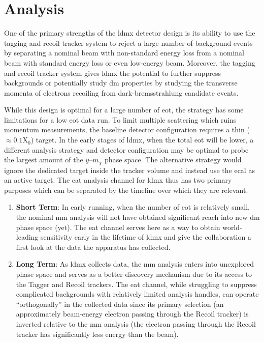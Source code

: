 \chapter{Analysis}
\label{chapter:ldmx:analysis}

One of the primary strengths of the \ac{ldmx} detector design is its ability to use the tagging
and recoil tracker system to reject a large number of background events by separating a nominal
beam with non-standard energy loss from a nominal beam with standard energy loss or even low-energy
beam. Moreover, the tagging and recoil tracker system gives \ac{ldmx} the potential to further suppress
backgrounds or potentially study \ac{dm} properties by studying the transverse momenta of electrons
recoiling from dark-bremsstrahlung candidate events.

While this design is optimal for a large number of \ac{eot}, the strategy has some limitations for a low
\ac{eot} data run. To limit multiple scattering which ruins momentum measurements, the baseline detector
configuration requires a thin ($\approx 0.1\mathrm{X}_0$) target. In the early stages of
\ac{ldmx}, when the total \ac{eot} will be lower, a different analysis strategy and detector configuration
may be optimal to probe the largest amount of the $y$--$m_\chi$ phase space. The alternative
strategy would ignore the dedicated target inside the tracker volume and instead use the \ac{ecal} as an
active target.
The \ac{eat} analysis channel for \ac{ldmx} thus has two primary purposes which can
be separated by the timeline over which they are relevant.
\begin{enumerate}
	\item \textbf{Short Term}: In early running, when the number of \ac{eot} is
	      relatively small, the nominal \ac{mm} analysis will not have obtained
	      significant reach into new \ac{dm} phase space (yet). The \ac{eat} channel
	      serves here as a way to obtain world-leading sensitivity early in the lifetime
	      of \ac{ldmx} and give the collaboration a first look at the data the apparatus
	      has collected.
	\item \textbf{Long Term}: As \ac{ldmx} collects data, the \ac{mm}
	      analysis enters into unexplored phase space and serves as a better discovery
	      mechanism due to its access to the Tagger and Recoil trackers. The \ac{eat}
	      channel, while struggling to suppress complicated backgrounds with relatively
	      limited analysis handles, can operate ``orthogonally'' in the collected data
	      since its primary selection (an approximately beam-energy electron passing
	      through the Recoil tracker) is inverted relative to the \ac{mm} analysis
	      (the electron passing through the Recoil tracker has significantly less
	      energy than the beam).
\end{enumerate}


